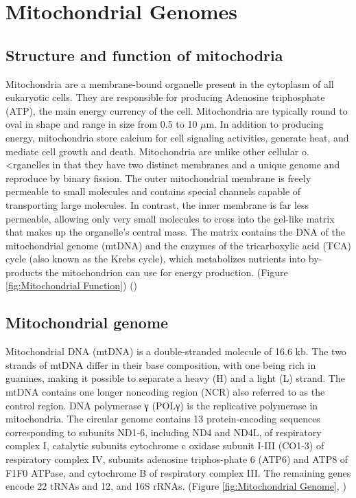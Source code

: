 \section{Mitochondrial Genomes}
\subsection{Structure and function of mitochodria}
Mitochondria are a membrane-bound organelle present in the cytoplasm of all eukaryotic cells. They are responsible for producing Adenosine triphosphate (ATP), the main energy currency of the cell.
Mitochondria are typically round to oval in shape and range in size from 0.5 to 10 $\mu$m. In addition to producing energy, mitochondria store calcium for cell signaling activities, generate heat, and mediate cell growth and death.
Mitochondria are unlike other cellular o.<rganelles in that they have two distinct membranes and a unique genome and reproduce by binary fission. 
The outer mitochondrial membrane is freely permeable to small molecules and contains special channels capable of transporting large molecules. 
In contrast, the inner membrane is far less permeable, allowing only very small molecules to cross into the gel-like matrix that makes up the organelle’s central mass. 
The matrix contains the DNA of the mitochondrial genome (mtDNA) and the enzymes of the tricarboxylic acid (TCA) cycle (also known as the Krebs cycle), which metabolizes nutrients into by-products the mitochondrion can use for energy production. (Figure \ref{fig:Mitochondrial Function}) (\cite{friedman2014mitochondrial})

\subsection{Mitochondrial genome}
Mitochondrial DNA (mtDNA) is a double-stranded molecule of 16.6 kb. The two strands of mtDNA differ in their base composition, with one being rich in guanines, making it possible to separate a heavy (H) and a light (L) strand. The mtDNA contains one longer noncoding region (NCR) also referred to as the control region. DNA polymerase γ (POLγ) is the replicative polymerase in mitochondria. 
The circular genome contains 13 protein‐encoding sequences corresponding to subunits ND1‐6, including ND4 and ND4L, of respiratory complex I, catalytic subunits cytochrome c oxidase subunit I-III (CO1-3) of respiratory complex IV, subunits adenosine triphos-phate 6 (ATP6) and ATP8 of F1F0 ATPase, and cytochrome B of respiratory complex III. 
The remaining genes encode 22 tRNAs and 12, and 16S rRNAs. (Figure \ref{fig:Mitochondrial Genome}, \cite{stefano2016mitochondrial, garone2018mitochondrial})\\

